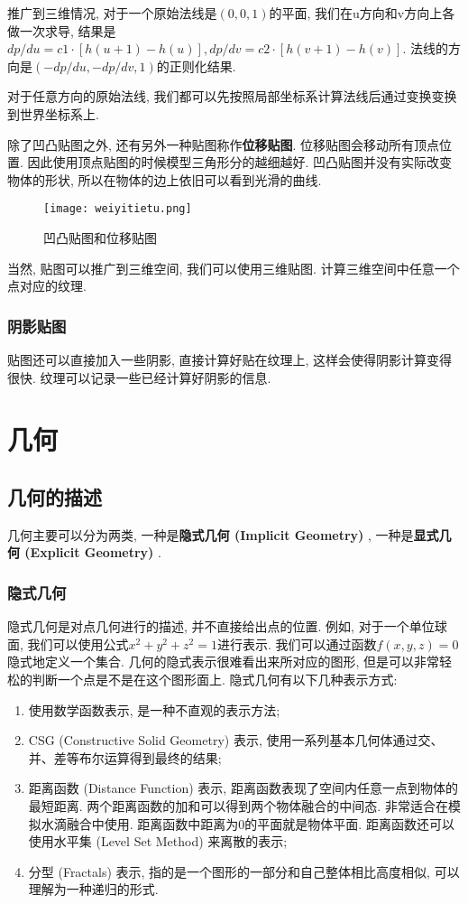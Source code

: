 \documentclass[openany]{progbookcn}
\begin{document}
推广到三维情况, 对于一个原始法线是$(0,0,1)$的平面, 我们在u方向和v方向上各做一次求导, 结果是$dp/du=c1\cdot [h(u+1)-h(u)],dp/dv=c2\cdot [h(v+1)-h(v)]$. 法线的方向是$(-dp/du,-dp/dv,1)$的正则化结果. 

对于任意方向的原始法线, 我们都可以先按照局部坐标系计算法线后通过变换变换到世界坐标系上. 

除了凹凸贴图之外, 还有另外一种贴图称作\textbf{位移贴图}. 位移贴图会移动所有顶点位置. 因此使用顶点贴图的时候模型三角形分的越细越好. 凹凸贴图并没有实际改变物体的形状, 所以在物体的边上依旧可以看到光滑的曲线. 
\begin{figure}[H]
	\centering
	\texttt{[image: weiyitietu.png]}
	\caption{凹凸贴图和位移贴图}
	\label{fig:weiyitietu}
\end{figure}

当然, 贴图可以推广到三维空间, 我们可以使用三维贴图. 计算三维空间中任意一个点对应的纹理. 

\section{阴影贴图}
贴图还可以直接加入一些阴影, 直接计算好贴在纹理上, 这样会使得阴影计算变得很快. 纹理可以记录一些已经计算好阴影的信息. 

\part{几何}
\chapter{几何的描述}

几何主要可以分为两类, 一种是\textbf{隐式几何 (Implicit Geometry) }, 一种是\textbf{显式几何 (Explicit Geometry) }. 

\section{隐式几何}
隐式几何是对点几何进行的描述, 并不直接给出点的位置. 例如, 对于一个单位球面, 我们可以使用公式$x^2+y^2+z^2=1$进行表示. 我们可以通过函数$f(x,y,z)=0$隐式地定义一个集合. 
几何的隐式表示很难看出来所对应的图形, 但是可以非常轻松的判断一个点是不是在这个图形面上. 隐式几何有以下几种表示方式: 
\begin{enumerate}
	\item 使用数学函数表示, 是一种不直观的表示方法; 
	\item CSG (Constructive Solid Geometry) 表示, 使用一系列基本几何体通过交、并、差等布尔运算得到最终的结果; 
	\item 距离函数 (Distance Function) 表示, 距离函数表现了空间内任意一点到物体的最短距离. 两个距离函数的加和可以得到两个物体融合的中间态. 非常适合在模拟水滴融合中使用. 距离函数中距离为0的平面就是物体平面. 距离函数还可以使用水平集 (Level Set Method) 来离散的表示; 
	\item 分型 (Fractals) 表示, 指的是一个图形的一部分和自己整体相比高度相似, 可以理解为一种递归的形式. 
\end{enumerate}
\end{document}
